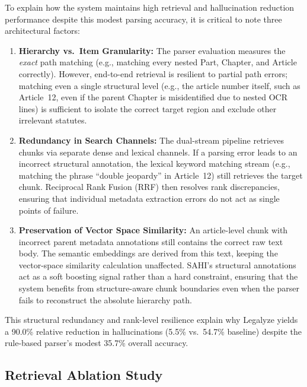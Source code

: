 To explain how the system maintains high retrieval and hallucination reduction
performance despite this modest parsing accuracy, it is critical to note three architectural
factors:
\begin{enumerate}
  \item \textbf{Hierarchy vs.\ Item Granularity:} The parser evaluation measures the \emph{exact} path matching (e.g., matching every nested Part, Chapter, and Article correctly). However, end-to-end retrieval is resilient to partial path errors; matching even a single structural level (e.g., the article number itself, such as Article~12, even if the parent Chapter is misidentified due to nested OCR lines) is sufficient to isolate the correct target region and exclude other irrelevant statutes.
  \item \textbf{Redundancy in Search Channels:} The dual-stream pipeline retrieves chunks via separate dense and lexical channels. If a parsing error leads to an incorrect structural annotation, the lexical keyword matching stream (e.g., matching the phrase ``double jeopardy'' in Article~12) still retrieves the target chunk. Reciprocal Rank Fusion (RRF) then resolves rank discrepancies, ensuring that individual metadata extraction errors do not act as single points of failure.
  \item \textbf{Preservation of Vector Space Similarity:} An article-level chunk with incorrect parent metadata annotations still contains the correct raw text body. The semantic embeddings are derived from this text, keeping the vector-space similarity calculation unaffected. SAHI's structural annotations act as a soft boosting signal rather than a hard constraint, ensuring that the system benefits from structure-aware chunk boundaries even when the parser fails to reconstruct the absolute hierarchy path.
\end{enumerate}
This structural redundancy and rank-level resilience explain why Legalyze yields a 90.0\% relative reduction in hallucinations (5.5\% vs.\ 54.7\% baseline) despite the rule-based parser's modest 35.7\% overall accuracy.


\subsection{Retrieval Ablation Study}

